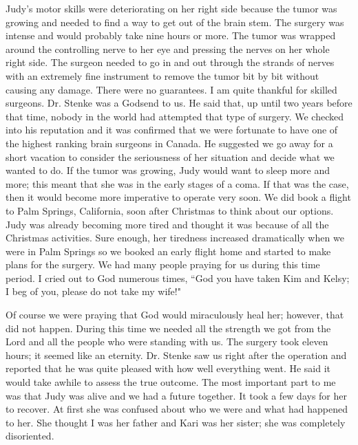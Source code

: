 \documentclass[oneside,12pt]{book}
\begin{document}
Judy's motor skills were deteriorating on her right side because the tumor was growing and needed to find a way to get out of the brain stem. The surgery was intense and would probably take nine hours or more. The tumor was wrapped around the controlling nerve to her eye and pressing the nerves on her whole right side. The surgeon needed to go in and out through the strands of nerves with an extremely fine instrument to remove the tumor bit by bit without causing any damage. There were no guarantees. I am quite thankful for skilled surgeons. Dr. Stenke was a Godsend to us. He said that, up until two years before that time, nobody in the world had attempted that type of surgery. We checked into his reputation and it was confirmed that we were fortunate to have one of the highest ranking brain surgeons in Canada. He suggested we go away for a short vacation to consider the seriousness of her situation and decide what we wanted to do. If the tumor was growing, Judy would want to sleep more and more; this meant that she was in the early stages of a coma. If that was the case, then it would become more imperative to operate very soon. We did book a flight to Palm Springs, California, soon after Christmas to think about our options. Judy was already becoming more tired and thought it was because of all the Christmas activities. Sure enough, her tiredness increased dramatically when we were in Palm Springs so we booked an early flight home and started to make plans for the surgery. We had many people praying for us during this time period. I cried out to God numerous times, ``God you have taken Kim and Kelsy; I beg of you, please do not take my wife!"

Of course we were praying that God would miraculously heal her; however, that did not happen. During this time we needed all the strength we got from the Lord and all the people who were standing with us. The surgery took eleven hours; it seemed like an eternity. Dr. Stenke saw us right after the operation and reported that he was quite pleased with how well everything went. He said it would take awhile to assess the true outcome. The most important part to me was that Judy was alive and we had a future together. It took a few days for her to recover. At first she was confused about who we were and what had happened to her. She thought I was her father and Kari was her sister; she was completely disoriented. 
\end{document}
